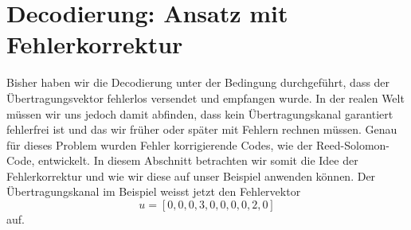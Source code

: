 %
%
%
\section{Decodierung: Ansatz mit Fehlerkorrektur
\label{reedsolomon:section:decmitfehler}}
Bisher haben wir die Decodierung unter der Bedingung durchgeführt, dass der Übertragungsvektor fehlerlos versendet und empfangen wurde.
In der realen Welt müssen wir uns jedoch damit abfinden, dass kein Übertragungskanal garantiert fehlerfrei ist und das wir früher oder später mit Fehlern rechnen müssen.
Genau für dieses Problem wurden Fehler korrigierende Codes, wie der Reed-Solomon-Code, entwickelt.
In diesem Abschnitt betrachten wir somit die Idee der Fehlerkorrektur und wie wir diese auf unser Beispiel anwenden können.
Der Übertragungskanal im Beispiel weisst jetzt den Fehlervektor 
\[
u = [0, 0, 0, 3, 0, 0, 0, 0, 2, 0]
\]
auf.

